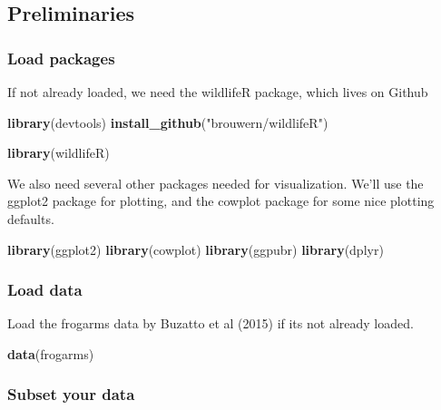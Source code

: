 \documentclass[]{book}
\newenvironment{Shaded}{\begin{snugshade}}{\end{snugshade}}
\newcommand{\KeywordTok}[1]{\textcolor[rgb]{0.13,0.29,0.53}{\textbf{#1}}}
\newcommand{\StringTok}[1]{\textcolor[rgb]{0.31,0.60,0.02}{#1}}
\newcommand{\NormalTok}[1]{#1}
\theoremstyle{definition}
\theoremstyle{definition}
\theoremstyle{definition}
\theoremstyle{remark}
\begin{document}
\subsection{Preliminaries}\label{preliminaries-2}

\subsubsection{Load packages}\label{load-packages-1}

If not already loaded, we need the wildlifeR package, which lives on
Github

\begin{Shaded}
\begin{Highlighting}[]
\KeywordTok{library}\NormalTok{(devtools)}
\KeywordTok{install_github}\NormalTok{(}\StringTok{"brouwern/wildlifeR"}\NormalTok{)}

\KeywordTok{library}\NormalTok{(wildlifeR)}
\end{Highlighting}
\end{Shaded}

We also need several other packages needed for visualization. We'll use
the ggplot2 package for plotting, and the cowplot package for some nice
plotting defaults.

\begin{Shaded}
\begin{Highlighting}[]
\KeywordTok{library}\NormalTok{(ggplot2)}
\KeywordTok{library}\NormalTok{(cowplot)}
\KeywordTok{library}\NormalTok{(ggpubr)}
\KeywordTok{library}\NormalTok{(dplyr)}
\end{Highlighting}
\end{Shaded}

\subsubsection{Load data}\label{load-data-1}

Load the frogarms data by Buzatto et al (2015) if its not already
loaded.

\begin{Shaded}
\begin{Highlighting}[]
\KeywordTok{data}\NormalTok{(frogarms)}
\end{Highlighting}
\end{Shaded}

\subsubsection{Subset your data}\label{subset-your-data-1}
\end{document}

